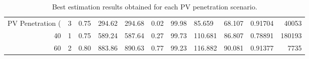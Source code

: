 \begin{table}
\caption{Best estimation results obtained for each PV penetration scenario.}
\label{tab:best_results}
\begin{tabular}{rrllllllllr}
\toprule
PV Penetration (%
\midrule
20 & 3 & 0.75 & 294.62 & 294.68 & 0.02 & 99.98 & 85.659 & 68.107 & 0.91704 & 40053 \\
40 & 1 & 0.75 & 589.24 & 587.64 & 0.27 & 99.73 & 110.681 & 86.807 & 0.78891 & 180193 \\
60 & 2 & 0.80 & 883.86 & 890.63 & 0.77 & 99.23 & 116.882 & 90.081 & 0.91377 & 7735 \\
\bottomrule
\end{tabular}
\end{table}
